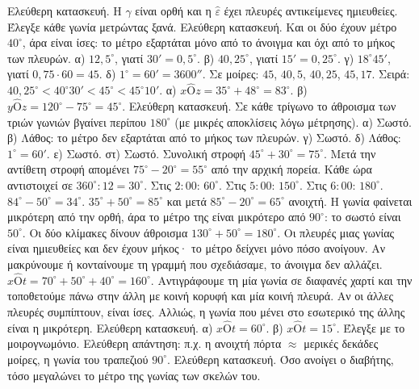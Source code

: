  Ελεύθερη κατασκευή. Η $\hat{\gamma}$ είναι ορθή και η $\hat{\varepsilon}$ έχει πλευρές αντικείμενες ημιευθείες. Έλεγξε κάθε γωνία μετρώντας ξανά.
 Ελεύθερη κατασκευή. Και οι δύο έχουν μέτρο $40^\circ$, άρα είναι ίσες: το μέτρο εξαρτάται μόνο από το άνοιγμα και όχι από το μήκος των πλευρών.
 α) $12{,}5^\circ$, γιατί $30'=0{,}5^\circ$. β) $40{,}25^\circ$, γιατί $15'=0{,}25^\circ$. γ) $18^\circ45'$, γιατί $0{,}75\cdot60=45$. δ) $1^\circ=60'=3600''$.
 Σε μοίρες: $45$, $40{,}5$, $40{,}25$, $45{,}17$. Σειρά: $40{,}25^\circ<40^\circ30'<45^\circ<45^\circ10'$.
 α) $x\hat{\mathrm{Ο}}z=35^\circ+48^\circ=83^\circ$. β) $y\hat{\mathrm{Ο}}z=120^\circ-75^\circ=45^\circ$.
 Ελεύθερη κατασκευή. Σε κάθε τρίγωνο το άθροισμα των τριών γωνιών βγαίνει περίπου $180^\circ$ (με μικρές αποκλίσεις λόγω μέτρησης).
 α) Σωστό. β) Λάθος: το μέτρο δεν εξαρτάται από το μήκος των πλευρών. γ) Σωστό. δ) Λάθος: $1^\circ=60'$. ε) Σωστό. στ) Σωστό.
 Συνολική στροφή $45^\circ+30^\circ=75^\circ$. Μετά την αντίθετη στροφή απομένει $75^\circ-20^\circ=55^\circ$ από την αρχική πορεία.
 Κάθε ώρα αντιστοιχεί σε $360^\circ:12=30^\circ$. Στις $2{:}00$: $60^\circ$. Στις $5{:}00$: $150^\circ$. Στις $6{:}00$: $180^\circ$.
 $84^\circ-50^\circ=34^\circ$.
 $35^\circ+50^\circ=85^\circ$ και μετά $85^\circ-20^\circ=65^\circ$ ανοιχτή.
 Η γωνία φαίνεται μικρότερη από την ορθή, άρα το μέτρο της είναι μικρότερο από $90^\circ$: το σωστό είναι $50^\circ$. Οι δύο κλίμακες δίνουν άθροισμα $130^\circ+50^\circ=180^\circ$.
 Οι πλευρές μιας γωνίας είναι ημιευθείες και δεν έχουν μήκος· το μέτρο δείχνει μόνο πόσο ανοίγουν. Αν μακρύνουμε ή κονταίνουμε τη γραμμή που σχεδιάσαμε, το άνοιγμα δεν αλλάζει.
 $x\hat{\mathrm{Ο}}t=70^\circ+50^\circ+40^\circ=160^\circ$.
 Αντιγράφουμε τη μία γωνία σε διαφανές χαρτί και την τοποθετούμε πάνω στην άλλη με κοινή κορυφή και μία κοινή πλευρά. Αν οι άλλες πλευρές συμπίπτουν, είναι ίσες. Αλλιώς, η γωνία που μένει στο εσωτερικό της άλλης είναι η μικρότερη.
 Ελεύθερη κατασκευή. α) $x\hat{\mathrm{Ο}}t=60^\circ$. β) $x\hat{\mathrm{Ο}}t=15^\circ$. Έλεγξε με το μοιρογνωμόνιο.
 Ελεύθερη απάντηση: π.χ. η ανοιχτή πόρτα $\approx$ μερικές δεκάδες μοίρες, η γωνία του τραπεζιού $90^\circ$.
 Ελεύθερη κατασκευή. Όσο ανοίγει ο διαβήτης, τόσο μεγαλώνει το μέτρο της γωνίας των σκελών του.
